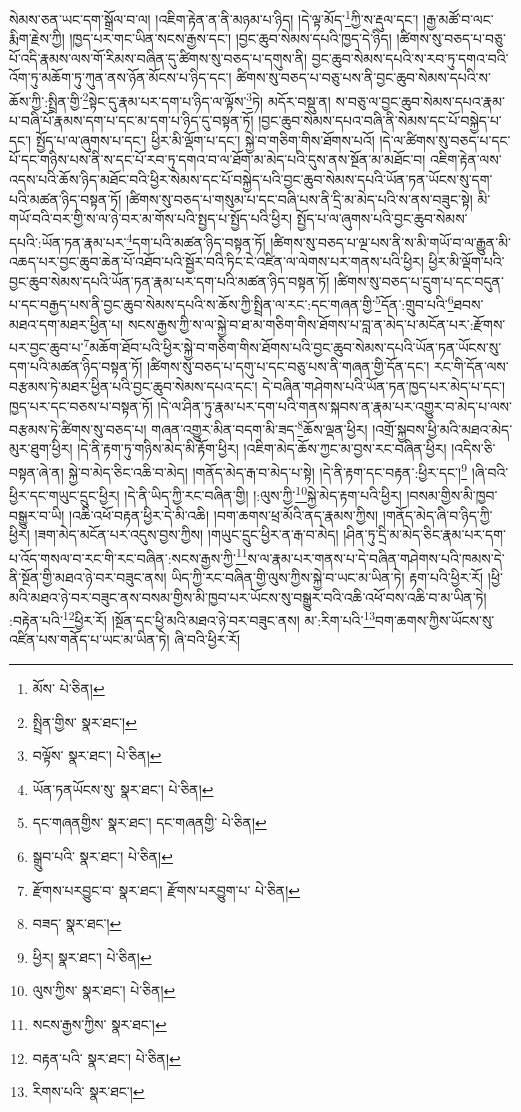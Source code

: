 སེམས་ཅན་ཡང་དག་སྒྲོལ་བ་ལ། །འཇིག་རྟེན་ན་ནི་མཉམ་པ་ཉིད། །དེ་ལྟ་མོད་\footnote{མོས་  པེ་ཅིན། }ཀྱི་ས་རྡུལ་དང་། །རྒྱ་མཚོ་བ་ལང་རྨིག་རྗེས་ཀྱི། །ཁྱད་པར་གང་ཡིན་སངས་རྒྱས་དང་། །བྱང་ཆུབ་སེམས་དཔའི་ཁྱད་དེ་ཉིད། །ཚིགས་སུ་བཅད་པ་བཅུ་པོ་འདི་རྣམས་ལས་གོ་རིམས་བཞིན་དུ་ཚིགས་སུ་བཅད་པ་དགུས་ནི། བྱང་ཆུབ་སེམས་དཔའི་ས་རབ་ཏུ་དགའ་བའི་འོག་ཏུ་མཆོག་ཏུ་ཀུན་ནས་ཉོན་མོངས་པ་ཉིད་དང་། ཚིགས་སུ་བཅད་པ་བཅུ་པས་ནི་བྱང་ཆུབ་སེམས་དཔའི་ས་ཆོས་ཀྱི་:སྤྲིན་གྱི་\footnote{སྤྲིན་གྱིས་  སྣར་ཐང་། }སྟེང་དུ་རྣམ་པར་དག་པ་ཉིད་ལ་ལྟོས་\footnote{བལྟོས་  སྣར་ཐང་།  པེ་ཅིན། }ཏེ། མདོར་བསྡུ་ན། ས་བཅུ་ལ་བྱང་ཆུབ་སེམས་དཔའ་རྣམ་པ་བཞི་པོ་རྣམས་དག་པ་དང་མ་དག་པ་ཉིད་དུ་བསྟན་ཏོ། །བྱང་ཆུབ་སེམས་དཔའ་བཞི་ནི་སེམས་དང་པོ་བསྐྱེད་པ་དང་། སྤྱོད་པ་ལ་ཞུགས་པ་དང་། ཕྱིར་མི་ལྡོག་པ་དང་། སྐྱེ་བ་གཅིག་གིས་ཐོགས་པའོ། །དེ་ལ་ཚིགས་སུ་བཅད་པ་དང་པོ་དང་གཉིས་པས་ནི་ས་དང་པོ་རབ་ཏུ་དགའ་བ་ལ་ཐོག་མ་མེད་པའི་དུས་ནས་སྔོན་མ་མཐོང་བ། འཇིག་རྟེན་ལས་འདས་པའི་ཆོས་ཉིད་མཐོང་བའི་ཕྱིར་སེམས་དང་པོ་བསྐྱེད་པའི་བྱང་ཆུབ་སེམས་དཔའི་ཡོན་ཏན་ཡོངས་སུ་དག་པའི་མཚན་ཉིད་བསྟན་ཏོ། །ཚིགས་སུ་བཅད་པ་གསུམ་པ་དང་བཞི་པས་ནི་དྲི་མ་མེད་པའི་ས་ནས་བཟུང་སྟེ། མི་གཡོ་བའི་བར་གྱི་ས་ལ་ཉེ་བར་མ་གོས་པའི་སྤྱད་པ་སྤྱོད་པའི་ཕྱིར། སྤྱོད་པ་ལ་ཞུགས་པའི་བྱང་ཆུབ་སེམས་དཔའི་:ཡོན་ཏན་རྣམ་པར་\footnote{ཡོན་ཏནཡོངས་སུ་  སྣར་ཐང་།  པེ་ཅིན། }དག་པའི་མཚན་ཉིད་བསྟན་ཏོ། །ཚིགས་སུ་བཅད་པ་ལྔ་པས་ནི་ས་མི་གཡོ་བ་ལ་རྒྱུན་མི་འཆད་པར་བྱང་ཆུབ་ཆེན་པོ་འཐོབ་པའི་སྦྱོར་བའི་ཏིང་ངེ་འཛིན་ལ་ལེགས་པར་གནས་པའི་ཕྱིར། ཕྱིར་མི་ལྡོག་པའི་བྱང་ཆུབ་སེམས་དཔའི་ཡོན་ཏན་རྣམ་པར་དག་པའི་མཚན་ཉིད་བསྟན་ཏོ། །ཚིགས་སུ་བཅད་པ་དྲུག་པ་དང་བདུན་པ་དང་བརྒྱད་པས་ནི་བྱང་ཆུབ་སེམས་དཔའི་ས་ཆོས་ཀྱི་སྤྲིན་ལ་རང་:དང་གཞན་གྱི་\footnote{དང་གཞནགྱིས་  སྣར་ཐང་། དང་གཞནགྱི་  པེ་ཅིན། }དོན་:གྲུབ་པའི་\footnote{སྒྲུབ་པའི་  སྣར་ཐང་།  པེ་ཅིན། }ཐབས་མཐའ་དག་མཐར་ཕྱིན་པ། སངས་རྒྱས་ཀྱི་ས་ལ་སྐྱེ་བ་ཐ་མ་གཅིག་གིས་ཐོགས་པ་བླ་ན་མེད་པ་མངོན་པར་:རྫོགས་པར་བྱང་ཆུབ་པ་\footnote{རྫོགས་པརབྱུང་བ་  སྣར་ཐང་། རྫོགས་པརབྱུག་པ་  པེ་ཅིན། }མཆོག་ཐོབ་པའི་ཕྱིར་སྐྱེ་བ་གཅིག་གིས་ཐོགས་པའི་བྱང་ཆུབ་སེམས་དཔའི་ཡོན་ཏན་ཡོངས་སུ་དག་པའི་མཚན་ཉིད་བསྟན་ཏོ། །ཚིགས་སུ་བཅད་པ་དགུ་པ་དང་བཅུ་པས་ནི་གཞན་གྱི་དོན་དང་། རང་གི་དོན་ལས་བརྩམས་ཏེ་མཐར་ཕྱིན་པའི་བྱང་ཆུབ་སེམས་དཔའ་དང་། དེ་བཞིན་གཤེགས་པའི་ཡོན་ཏན་ཁྱད་པར་མེད་པ་དང་། ཁྱད་པར་དང་བཅས་པ་བསྟན་ཏོ། །དེ་ལ་ཤིན་ཏུ་རྣམ་པར་དག་པའི་གནས་སྐབས་ན་རྣམ་པར་འགྱུར་བ་མེད་པ་ལས་བརྩམས་ཏེ་ཚིགས་སུ་བཅད་པ། གཞན་འགྱུར་མིན་བདག་མི་ཟད་\footnote{བཟད་  སྣར་ཐང་། }ཆོས་ལྡན་ཕྱིར། །འགྲོ་སྐྱབས་ཕྱི་མའི་མཐའ་མེད་མུར་ཐུག་ཕྱིར། །དེ་ནི་རྟག་ཏུ་གཉིས་མེད་མི་རྟོག་ཕྱིར། །འཇིག་མེད་ཆོས་ཀྱང་མ་བྱས་རང་བཞིན་ཕྱིར། །འདིས་ཅི་བསྟན་ཞེ་ན། སྐྱེ་བ་མེད་ཅིང་འཆི་བ་མེད། །གནོད་མེད་རྒ་བ་མེད་པ་སྟེ། །དེ་ནི་རྟག་དང་བརྟན་:ཕྱིར་དང་།\footnote{ཕྱིར།  སྣར་ཐང་།  པེ་ཅིན། } །ཞི་བའི་ཕྱིར་དང་གཡུང་དྲུང་ཕྱིར། །དེ་ནི་ཡིད་ཀྱི་རང་བཞིན་གྱི། །:ལུས་ཀྱི་\footnote{ལུས་ཀྱིས་  སྣར་ཐང་།  པེ་ཅིན། }སྐྱེ་མེད་རྟག་པའི་ཕྱིར། །བསམ་གྱིས་མི་ཁྱབ་བསྒྱུར་བ་ཡི། །འཆི་འཕོ་བརྟན་ཕྱིར་དེ་མི་འཆི། །བག་ཆགས་ཕྲ་མོའི་ནད་རྣམས་ཀྱིས། །གནོད་མེད་ཞི་བ་ཉིད་ཀྱི་ཕྱིར། །ཟག་མེད་མངོན་པར་འདུས་བྱས་ཀྱིས། །གཡུང་དྲུང་ཕྱིར་ན་རྒ་བ་མེད། །ཤིན་ཏུ་དྲི་མ་མེད་ཅིང་རྣམ་པར་དག་པ་འོད་གསལ་བ་རང་གི་རང་བཞིན་:སངས་རྒྱས་ཀྱི་\footnote{སངས་རྒྱས་ཀྱིས་  སྣར་ཐང་། }ས་ལ་རྣམ་པར་གནས་པ་དེ་བཞིན་གཤེགས་པའི་ཁམས་དེ་ནི་སྔོན་གྱི་མཐའ་ཉེ་བར་བཟུང་ནས། ཡིད་ཀྱི་རང་བཞིན་གྱི་ལུས་ཀྱིས་སྐྱེ་བ་ཡང་མ་ཡིན་ཏེ། རྟག་པའི་ཕྱིར་རོ། །ཕྱི་མའི་མཐའ་ཉེ་བར་བཟུང་ནས་བསམ་གྱིས་མི་ཁྱབ་པར་ཡོངས་སུ་བསྒྱུར་བའི་འཆི་འཕོ་བས་འཆི་བ་མ་ཡིན་ཏེ། :བརྟེན་པའི་\footnote{བརྟན་པའི་  སྣར་ཐང་།  པེ་ཅིན། }ཕྱིར་རོ། །སྔོན་དང་ཕྱི་མའི་མཐའ་ཉེ་བར་བཟུང་ནས། མ་:རིག་པའི་\footnote{རིགས་པའི་  སྣར་ཐང་། }བག་ཆགས་ཀྱིས་ཡོངས་སུ་འཛིན་པས་གནོད་པ་ཡང་མ་ཡིན་ཏེ། ཞི་བའི་ཕྱིར་རོ། 